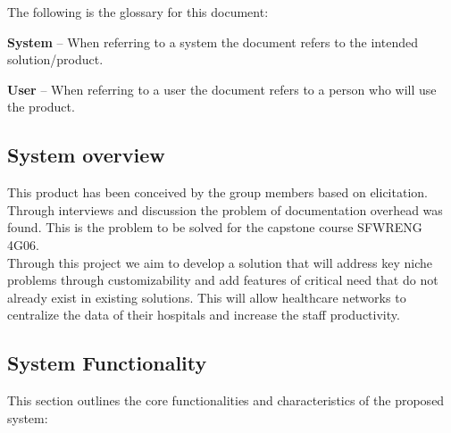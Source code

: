 \documentclass[12pt]{article}
\begin{document}
The following is the glossary for this document:

\textbf{System} -- When referring to a system the document refers to the intended solution/product.


\textbf{User} -- When referring to a user the document refers to a person who will use the product.


\subsection{System overview}

This product has been conceived by the group members based on elicitation. Through interviews and discussion the problem of documentation overhead was found. This is the problem to be solved for the capstone course SFWRENG 4G06.\\

Through this project we aim to develop a solution that will address key niche problems through customizability and add features of critical need that do not already exist in existing solutions. This will allow healthcare networks to centralize the data of their hospitals and increase the staff productivity.

\subsection{System Functionality}

This section outlines the core functionalities and characteristics of the proposed system:
\end{document}

